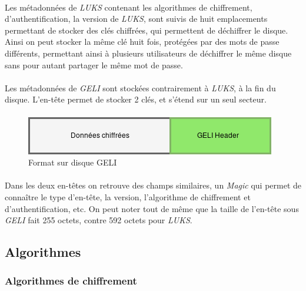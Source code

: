 \paragraph{}
Les métadonnées de {\em LUKS} contenant les algorithmes de chiffrement, 
d'authentification, la version de {\em LUKS}, sont suivis de huit emplacements 
permettant de stocker des clés chiffrées, qui permettent de déchiffrer le 
disque. Ainsi on peut stocker la même clé huit fois, protégées par des mots de 
passe différents, permettant ainsi à plusieurs utilisateurs de déchiffrer le 
même disque sans pour autant partager le même mot de passe.

\paragraph{}
Les métadonnées de {\em GELI} sont stockées contrairement à {\em LUKS}, 
à la fin du disque.
L'en-tête permet de stocker 2 clés, et s'étend sur un seul secteur.


\paragraph{}
\begin{figure}[h]
\centering
\includegraphics[width=.5\linewidth]{etat_art/format_disque_geli.png}
\caption{\label{fig:GELIFormat}Format sur disque GELI}
\end{figure}

\paragraph{}
Dans les deux en-têtes on retrouve des champs similaires, un {\em Magic} qui 
permet de connaître le type d'en-tête, la version, l'algorithme de chiffrement 
et d'authentification, etc. On peut noter tout de même que la taille de 
l'en-tête sous {\em GELI} fait 255 octets, contre 592 octets pour {\em LUKS}.



\subsection{Algorithmes}
\subsubsection{Algorithmes de chiffrement}
